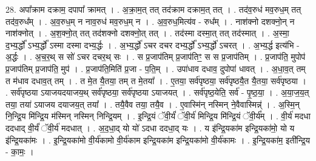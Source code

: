 \documentclass[17pt]{extarticle}
\begin{document}
28. अपा᳚क्राम दक्राम॒ दपापा᳚ क्रामत् । . अ॒क्रा॒म॒त् तत् तद॑क्राम दक्राम॒त् तत् । . तद॑व॒रुध॑ मव॒रुध॒म् तत् तद॑व॒रुध᳚म् । . अ॒व॒रुध॒म् न नाव॒रुध॑ मव॒रुध॒म् न । . अ॒व॒रुध॒मित्य॑व - रुध᳚म् । . नाश॑क्नो दशक्नो॒न् न नाश॑क्नोत् । . अ॒श॒क्नो॒त् तत् तद॑शक्नो दशक्नो॒त् तत् । . तद॑स्मा दस्मा॒त् तत् तद॑स्मात् । . अ॒स्मा॒ द॒भ्य॒र्द्धो᳚ ऽभ्य॒र्द्धो᳚ ऽस्मा दस्मा दभ्य॒र्द्धः । . अ॒भ्य॒र्द्धो॑ ऽचर दचर दभ्य॒र्द्धो᳚ ऽभ्य॒र्द्धो॑ ऽचरत् । . अ॒भ्य॒र्द्ध इत्य॑भि - अ॒र्द्धः । . अ॒च॒र॒थ् स सो॑ ऽचर दचर॒थ् सः । . स प्र॒जाप॑तिम् प्र॒जाप॑तिꣳ॒॒ स स प्र॒जाप॑तिम् । . प्र॒जाप॑ति॒ मुपोप॑ प्र॒जाप॑तिम् प्र॒जाप॑ति॒ मुप॑ । . प्र॒जाप॑ति॒मिति॑ प्र॒जा - प॒ति॒म् । . उपा॑धाव दधाव॒ दुपोपा॑ धावत् । . अ॒धा॒व॒त् तम् त म॑धाव दधाव॒त् तम् । . त मे॒त यै॒तया॒ तम् त मे॒तया᳚ । . ए॒तया॒ सर्व॑पृष्ठया॒ सर्व॑पृष्ठयै॒त यै॒तया॒ सर्व॑पृष्ठया । . सर्व॑पृष्ठया ऽयाजयदयाजय॒थ् सर्व॑पृष्ठया॒ सर्व॑पृष्ठया ऽयाजयत् । . सर्व॑पृष्ठ॒येति॒ सर्व॑ - पृ॒ष्ठ॒या॒ । . अ॒या॒ज॒य॒त् तया॒ तया॑ ऽयाजय दयाजय॒त् तया᳚ । . तयै॒वैव तया॒ तयै॒व । . ए॒वास्मि॑न् नस्मिन् ने॒वैवास्मिन्न्॑ । . अ॒स्मि॒न् नि॒न्द्रि॒य मि॑न्द्रि॒य म॑स्मिन् नस्मिन् निन्द्रि॒यम् । . इ॒न्द्रि॒यं ॅवी॒र्यं॑ ॅवी॒र्य॑ मिन्द्रि॒य मि॑न्द्रि॒यं ॅवी॒र्य᳚म् । . वी॒र्य॑ मदधा ददधाद् वी॒र्यं॑ ॅवी॒र्य॑ मदधात् । . अ॒द॒धा॒द् यो यो॑ ऽदधा ददधा॒द् यः । . य इ॑न्द्रि॒यका॑म इन्द्रि॒यका॑मो॒ यो य इ॑न्द्रि॒यका॑मः । . इ॒न्द्रि॒यका॑मो वी॒र्य॑कामो वी॒र्य॑काम इन्द्रि॒यका॑म इन्द्रि॒यका॑मो वी॒र्य॑कामः । . इ॒न्द्रि॒यका॑म॒ इती᳚न्द्रि॒य - का॒मः॒ । \newline
\end{document}
